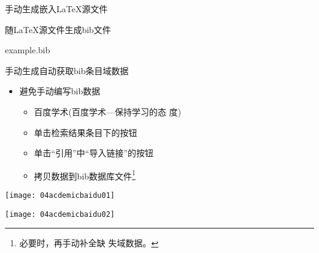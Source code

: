 \documentclass[fontset = none, t]{ctexbeamer}
\begin{document}
\begin{frame}[fragile]{手动生成}{嵌入\LaTeX 源文件}
\begin{spacing}{1.3}
\begin{center}
\begin{minipage}[h]{0.55\linewidth}
\begin{textcb}{随\LaTeX 源文件生成bib文件}
\begin{filecontents}{example.bib}
\begin{frame}[fragile]{手动生成}{自动获取bib条目域数据}
  \begin{spacing}{1.5}
    \begin{itemize}
    \item 避免手动编写bib数据
      \begin{itemize}
      \item 百度学术(百度学术---保持学习的态
        度)
      \item 单击检索结果条目下的\alert{}按钮
      \item 单击\enquote{引用}中\enquote{导入链接}的\alert{}按钮
      \item 拷贝数据到bib数据库文件\footnote[frame,2]{必要时，再手动补全缺
          失域数据。}
      \end{itemize}
    \end{itemize}    
    \begin{center}
      \begin{annotatedFigure}
        {\texttt{[image: 04acdemicbaidu01]}}
      \end{annotatedFigure}\quad
      \begin{annotatedFigure}
        {\texttt{[image: 04acdemicbaidu02]}}
      \end{annotatedFigure}
    \end{center}
  \end{spacing}
\end{frame}


\end{filecontents}
\end{textcb}
\end{minipage}
\end{center}
\end{spacing}
\end{frame}
\end{document}
